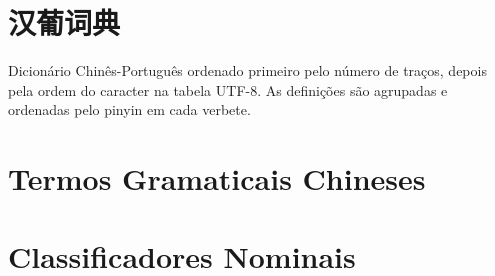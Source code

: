\documentclass[a4paper,9pt,twoside,openright,book]{memoir}
\begin{document}
\let\clearforchapter\par %



\clearpage
\pagestyle{empty}
\tableofcontents

\clearpage
\pagestyle{empty}
\chapter{汉葡词典}

%
%

Dicionário Chinês-Português ordenado primeiro pelo número de traços,
depois pela ordem do caracter na tabela UTF-8.  As definições são
agrupadas e ordenadas pelo pinyin em cada verbete.

\clearpage
\pagestyle{dictionary}
\twocolumn






















%
%
%
%
%
%
%
%
%
\onecolumn

\ifdraftdoc 
\else

\clearpage
\pagestyle{plain}
\chapter{Termos Gramaticais Chineses}


\clearpage
\pagestyle{plain}
\chapter{Classificadores Nominais}

\end{document}
